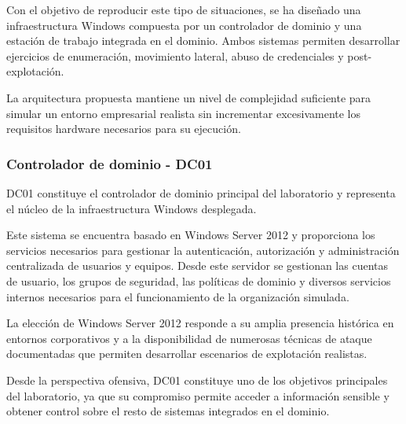 Con el objetivo de reproducir este tipo de situaciones, se ha diseñado una infraestructura Windows compuesta por un controlador de dominio y una estación de trabajo integrada en el dominio. Ambos sistemas permiten desarrollar ejercicios de enumeración, movimiento lateral, abuso de credenciales y post-explotación.

La arquitectura propuesta mantiene un nivel de complejidad suficiente para simular un entorno empresarial realista sin incrementar excesivamente los requisitos hardware necesarios para su ejecución.



\subsubsection{Controlador de dominio - DC01}

DC01 constituye el controlador de dominio principal del laboratorio y representa el núcleo de la infraestructura Windows desplegada.

Este sistema se encuentra basado en Windows Server 2012 y proporciona los servicios necesarios para gestionar la autenticación, autorización y administración centralizada de usuarios y equipos. Desde este servidor se gestionan las cuentas de usuario, los grupos de seguridad, las políticas de dominio y diversos servicios internos necesarios para el funcionamiento de la organización simulada.

La elección de Windows Server 2012 responde a su amplia presencia histórica en entornos corporativos y a la disponibilidad de numerosas técnicas de ataque documentadas que permiten desarrollar escenarios de explotación realistas.

Desde la perspectiva ofensiva, DC01 constituye uno de los objetivos principales del laboratorio, ya que su compromiso permite acceder a información sensible y obtener control sobre el resto de sistemas integrados en el dominio.

